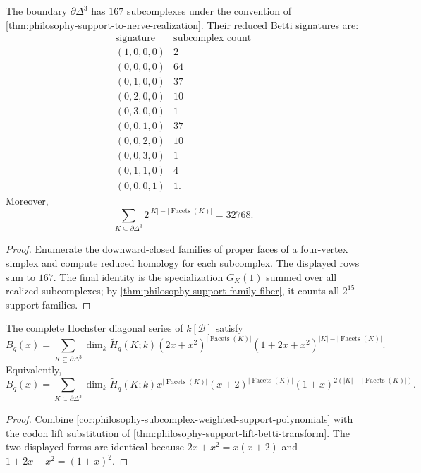 \begin{theorem}
\label{thm:philosophy-tetrahedron-boundary-subcomplex-census}
The boundary $\partial\Delta^{3}$ has $167$ subcomplexes under the
convention of \autoref{thm:philosophy-support-to-nerve-realization}.
Their reduced Betti signatures are:
$$
\begin{array}{c|r}
  \text{signature} & \text{subcomplex count}\\
  \hline
  (1,0,0,0) & 2\\
  (0,0,0,0) & 64\\
  (0,1,0,0) & 37\\
  (0,2,0,0) & 10\\
  (0,3,0,0) & 1\\
  (0,0,1,0) & 37\\
  (0,0,2,0) & 10\\
  (0,0,3,0) & 1\\
  (0,1,1,0) & 4\\
  (0,0,0,1) & 1.
\end{array}
$$
Moreover,
$$
  \sum_{K\subseteq\partial\Delta^{3}}
  2^{|K|-|\operatorname{Facets}(K)|}
  =
  32768.
$$
\end{theorem}
\begin{proof}
Enumerate the downward-closed families of proper faces of a four-vertex
simplex and compute reduced homology for each subcomplex. The displayed
rows sum to $167$. The final identity is the specialization
$G_{K}(1)$ summed over all realized subcomplexes; by
\autoref{thm:philosophy-support-family-fiber}, it counts all
$2^{15}$ support families.
\end{proof}

\begin{theorem}
\label{thm:philosophy-support-to-nerve-betti-formula}
The complete Hochster diagonal series of $k[\mathcal{B}]$ satisfy
$$
  B_{q}(x)
  =
  \sum_{K\subseteq\partial\Delta^{3}}
  \dim_{k}\widetilde{H}_{q}(K;k)
  (2x+x^{2})^{|\operatorname{Facets}(K)|}
  (1+2x+x^{2})^{|K|-|\operatorname{Facets}(K)|}.
$$
Equivalently,
$$
  B_{q}(x)
  =
  \sum_{K\subseteq\partial\Delta^{3}}
  \dim_{k}\widetilde{H}_{q}(K;k)
  x^{|\operatorname{Facets}(K)|}
  (x+2)^{|\operatorname{Facets}(K)|}
  (1+x)^{2(|K|-|\operatorname{Facets}(K)|)}.
$$
\end{theorem}
\begin{proof}
Combine
\autoref{cor:philosophy-subcomplex-weighted-support-polynomials} with
the codon lift substitution of
\autoref{thm:philosophy-support-lift-betti-transform}. The two displayed
forms are identical because $2x+x^{2}=x(x+2)$ and
$1+2x+x^{2}=(1+x)^{2}$.
\end{proof}

